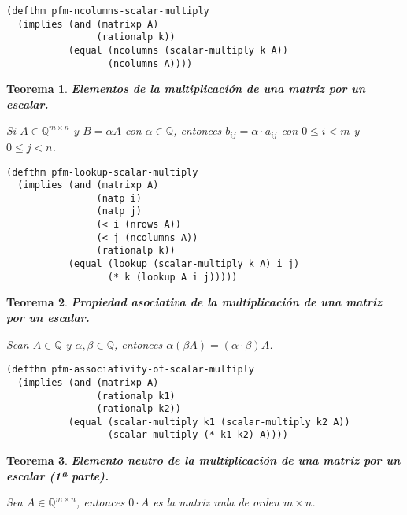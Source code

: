 \documentclass[a4paper,10pt]{article}
\newcommand{\Q}[1]{#1 \in \mathbb{Q}}
\newcommand{\M}[3]{#1 \in \mathbb{Q}^{#2 \times #3}}
\newtheorem{teor}{{Teorema}}
\begin{document}
\begin{lstlisting}[language=clips]
(defthm pfm-ncolumns-scalar-multiply
  (implies (and (matrixp A)
                (rationalp k))
           (equal (ncolumns (scalar-multiply k A)) 
                  (ncolumns A))))
\end{lstlisting}

\par \vspace{16pt}

\begin{teor} \textbf{Elementos de la multiplicación de una matriz por un escalar.}\vspace{8pt}\par
Si $\M{A}{m}{n}$ y $B=\alpha A$ con $\Q{\alpha}$, entonces $b_{ij} = \alpha \cdot a_{ij}$ con $0 \leq i < m$ y $0 \leq j < n$.
\end{teor}

\begin{lstlisting}[language=clips]
(defthm pfm-lookup-scalar-multiply
  (implies (and (matrixp A)
                (natp i)
                (natp j)
                (< i (nrows A))
                (< j (ncolumns A))
                (rationalp k))
           (equal (lookup (scalar-multiply k A) i j)
                  (* k (lookup A i j)))))
\end{lstlisting}

\par \vspace{16pt}

\begin{teor} \textbf{Propiedad asociativa de la multiplicación de una matriz por un escalar.}\vspace{8pt}\par
Sean $\Q{A}$ y $\Q{\alpha, \beta}$, entonces $\alpha(\beta A) = (\alpha\cdot\beta)A$.
\end{teor}

\begin{lstlisting}[language=clips]
(defthm pfm-associativity-of-scalar-multiply
  (implies (and (matrixp A)
                (rationalp k1)
                (rationalp k2))
           (equal (scalar-multiply k1 (scalar-multiply k2 A))
                  (scalar-multiply (* k1 k2) A))))
\end{lstlisting}

\par \vspace{16pt}

\begin{teor} \textbf{Elemento neutro de la multiplicación de una matriz por un escalar (1ª parte).}\vspace{8pt}\par
Sea $\M{A}{m}{n}$, entonces $0\cdot A$ es la matriz nula de orden $m \times n$.
\end{teor}
\end{document}
